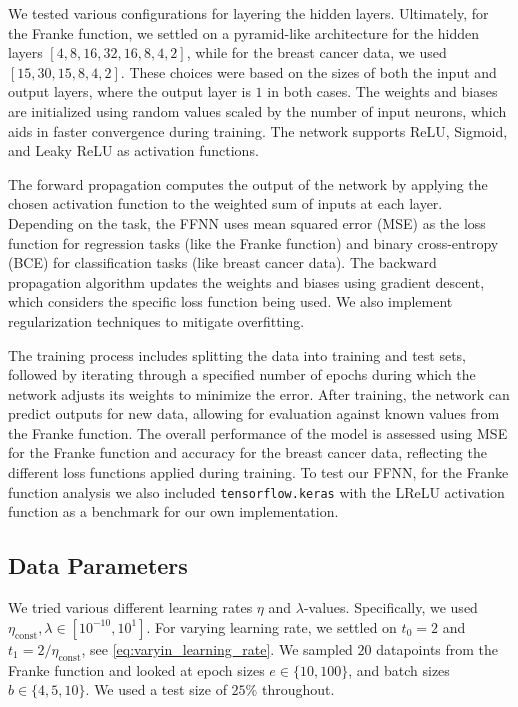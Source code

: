 \documentclass[%
reprint,s
amsmath,amssymb,
aps,
]{revtex4-2}
\begin{document}
We tested various configurations for layering the hidden layers. Ultimately, for the Franke function, we settled on a pyramid-like architecture for the hidden layers \([4,8,16,32,16,8,4,2]\), while for the breast cancer data, we used \([15,30,15,8,4,2]\). These choices were based on the sizes of both the input and output layers, where the output layer is \(1\) in both cases. The weights and biases are initialized using random values scaled by the number of input neurons, which aids in faster convergence during training. The network supports ReLU, Sigmoid, and Leaky ReLU as activation functions. 

The forward propagation computes the output of the network by applying the chosen activation function to the weighted sum of inputs at each layer. Depending on the task, the FFNN uses mean squared error (MSE) as the loss function for regression tasks (like the Franke function) and binary cross-entropy (BCE) for classification tasks (like breast cancer data). The backward propagation algorithm updates the weights and biases using gradient descent, which considers the specific loss function being used. We also implement regularization techniques to mitigate overfitting.

The training process includes splitting the data into training and test sets, followed by iterating through a specified number of epochs during which the network adjusts its weights to minimize the error. After training, the network can predict outputs for new data, allowing for evaluation against known values from the Franke function. The overall performance of the model is assessed using MSE for the Franke function and accuracy for the breast cancer data, reflecting the different loss functions applied during training. To test our FFNN, for the Franke function analysis we also included \texttt{tensorflow.keras} with the LReLU activation function as a benchmark for our own implementation.

\subsection{Data Parameters}
We tried various different learning rates \(\eta\) and \(\lambda\)-values. Specifically, we used \(\eta_{\text{const}}, \lambda \in[10^{-10}, 10^{1}]\). For varying learning rate, we settled on \(t_0=2\) and \(t_{1} = 2 / \eta_{\text{const}} \), see \eqref{eq:varyin_learning_rate}. We sampled \(20\) datapoints from the Franke function and looked at epoch sizes \(e \in \{10, 100\}\), and batch sizes \(b\in\{4, 5, 10\}\). 
We used a test size of \(25\%\) throughout. 
\end{document}
